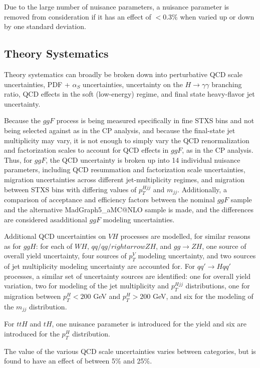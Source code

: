 Due to the large number of nuisance parameters, a nuisance parameter is removed from consideration if it has an effect of $< 0.3\%$ when varied up or down by one standard deviation.

\subsection{Theory Systematics} \label{subsec:Theorysysts}

Theory systematics can broadly be broken down into perturbative QCD scale uncertainties, PDF + $\alpha_{S}$ uncertainties, uncertainty on the $H \rightarrow \gamma \gamma$ branching ratio, QCD effects in the soft (low-energy) regime, and final state heavy-flavor jet uncertainty.

Because the $ggF$ process is being measured specifically in fine STXS bins and not being selected against as in the CP analysis, and because the final-state jet multiplicity may vary, it is not enough to simply vary the QCD renormalization and factorization scales to account for QCD effects in $ggF$, as in the CP analysis. Thus, for $ggF$, the QCD uncertainty is broken up into 14 individual nuisance parameters, including QCD resummation and factorization scale uncertainties, migration uncertainties across different jet-multiplicity regimes, and migration between STXS bins with differing values of $p_{T}^{Hjj}$ and $m_{jj}$. Additionally, a comparison of acceptance and efficiency factors between the nominal $ggF$ sample and the alternative MadGraph5\_aMC@NLO sample is made, and the differences are considered asadditional $ggF$ modeling uncertainties.

Additional QCD uncertainties on $VH$ processes are modelled, for similar reasons as for $ggH$: for each of $WH$, $qq/qg /rightarrow ZH$, and $gg \rightarrow ZH$, one source of overall yield uncertainty, four sources of $p_{T}^{V}$ modeling uncertainty, and two sources of jet multiplicity modeling uncertainty are accounted for. For $qq' \rightarrow H qq'$ processes, a similar set of uncertainty sources are identified: one for overall yield variation, two for modeling of the jet multiplicity and $p_{T}^{Hjj}$ distributions, one for migration between $p_{T}^{H} < 200$ GeV and $p_{T}^{H} > 200$ GeV, and six for the modeling of the $m_{jj}$ distribution.

For $ttH$ and $tH$, one nuisance parameter is introduced for the yield and six are introduced for the $p_{T}^{H}$ distribution.

The value of the various QCD scale uncertainties varies between categories, but is found to have an effect of between 5\% and 25\%.

